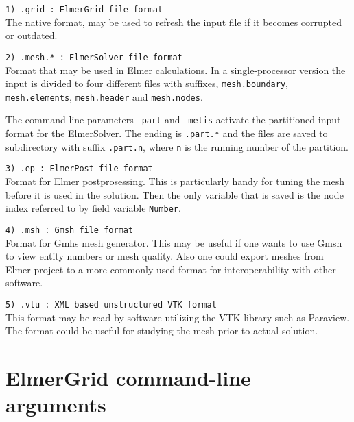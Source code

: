 \begin{description}

\item \texttt{1)  .grid     : ElmerGrid file format} \\
The native format, may be used to refresh the input file if it becomes
corrupted or outdated.

\item \texttt{2)  .mesh.*   : ElmerSolver file format} \\
Format that may be used in Elmer calculations.
In a single-processor version 
the input is divided to four different files with 
suffixes, \texttt{mesh.boundary}, \texttt{mesh.elements},
\texttt{mesh.header} and \texttt{mesh.nodes}.

The command-line parameters \texttt{-part} and \texttt{-metis} 
activate the partitioned 
input format for the ElmerSolver. 
The ending is \texttt{.part.*} and the 
files are saved to 
subdirectory with suffix \texttt{.part.n}, where
\texttt{n} is the running number of the partition.

\item \texttt{3)  .ep       : ElmerPost file format} \\
Format for Elmer postprosessing. This is particularly handy for tuning the
mesh before it is used in the solution. Then the only variable that is saved is 
the node index referred to by field variable \texttt{Number}.

\item \texttt{4)  .msh      : Gmsh file format} \\
Format for Gmhs mesh generator. This may be useful if one wants to use Gmsh to view entity numbers or mesh quality. 
Also one could export meshes from Elmer project to a more commonly used format for interoperability with other software.

\item \texttt{5)  .vtu      : XML based unstructured VTK format} \\
This format may be read by software utilizing the VTK library such as Paraview. 
The format could be useful for studying the mesh prior to actual solution.



\end{description}



\section{ElmerGrid command-line arguments}

